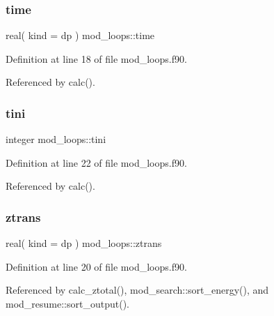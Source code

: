 \mbox{\label{namespacemod__loops_acb345fb5782ee4c7fd3c419baff2c135}} 
\subsubsection{\texorpdfstring{time}{time}}
{\footnotesize\ttfamily real( kind = dp ) mod\+\_\+loops\+::time}



Definition at line 18 of file mod\+\_\+loops.\+f90.



Referenced by calc().

\mbox{\label{namespacemod__loops_adc96eb69b7265038868c81104240ee96}} 
\subsubsection{\texorpdfstring{tini}{tini}}
{\footnotesize\ttfamily integer mod\+\_\+loops\+::tini}



Definition at line 22 of file mod\+\_\+loops.\+f90.



Referenced by calc().

\mbox{\label{namespacemod__loops_a6975a502e7bc56e3b95ee8ed8db8e658}} 
\subsubsection{\texorpdfstring{ztrans}{ztrans}}
{\footnotesize\ttfamily real( kind = dp ) mod\+\_\+loops\+::ztrans}



Definition at line 20 of file mod\+\_\+loops.\+f90.



Referenced by calc\+\_\+ztotal(), mod\+\_\+search\+::sort\+\_\+energy(), and mod\+\_\+resume\+::sort\+\_\+output().

